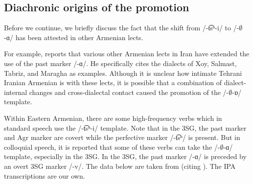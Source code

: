 \subsection{Diachronic origins of the promotion}\label{section:verb:past:diachrony}

Before we continue, we     briefly discuss the fact that   the shift from /-\t{ts}ʰ-i/ to /-$\emptyset$-ɑ/ has been attested in other Armenian lects. 

For example, \citet[201]{Adjarian-1961-Liakatar4Book2Conj} reports that various other Armenian lects in Iran have extended the use of the past marker /-ɑ/. He specifically cites the dialects of Xoy, Salmast, Tabriz, and Maragha as examples. Although it is unclear how intimate Tehrani Iranian Armenian is with these lects, it is possible that a combination of dialect-internal changes and cross-dialectal contact caused the promotion of the /-$\emptyset$-ɒ/ template. 

Within Eastern Armenian, there are some high-frequency verbs which in standard speech use the /-\t{ts}ʰ-i/ template. Note that in the 3SG, the past marker and Agr marker are covert while the perfective marker /-\t{ts}ʰ/ is present.  But in colloquial speech,  it is reported that some of these verbs can take the  /-$\emptyset$-ɑ/ template, especially in the 3SG. In the 3SG, the past marker /-ɑ/ is preceded by an overt 3SG marker /-v/. The data below are taken from    \citet[230]{DumTragut-2009-ArmenianReferenceGrammar} (citing \citealt[98]{Gharagyulyan-1981-ColloquialArmenian}). The IPA transcriptions are our own. 

